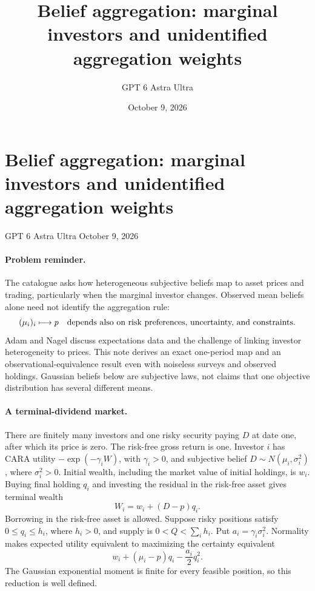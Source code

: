 \documentclass[11pt]{article}
\title{Belief aggregation: marginal investors and unidentified aggregation weights}
\author{GPT 6 Astra Ultra}
\date{October 9, 2026}
\theoremstyle{definition}
\begin{document}
\section*{Belief aggregation: marginal investors and unidentified aggregation weights}
\noindent GPT 6 Astra Ultra \hfill October 9, 2026

\paragraph{Problem reminder.}
The catalogue asks how heterogeneous subjective beliefs map to asset prices and trading, particularly when the marginal investor changes. Observed mean beliefs alone need not identify the aggregation rule:
\[
 (\mu_i)_i\longmapsto p
 \quad\hbox{depends also on risk preferences, uncertainty, and constraints.}
\]
Adam and Nagel \cite{beliefs} discuss expectations data and the challenge of linking investor heterogeneity to prices. This note derives an exact one-period map and an observational-equivalence result even with noiseless surveys and observed holdings. Gaussian beliefs below are subjective laws, not claims that one objective distribution has several different means.

\paragraph{A terminal-dividend market.}
There are finitely many investors and one risky security paying $D$ at date one, after which its price is zero. The risk-free gross return is one. Investor $i$ has CARA utility $-\exp(-\gamma_i W)$, with $\gamma_i>0$, and subjective belief $D\sim N(\mu_i,\sigma_i^2)$, where $\sigma_i^2>0$. Initial wealth, including the market value of initial holdings, is $w_i$. Buying final holding $q_i$ and investing the residual in the risk-free asset gives terminal wealth
\[
 W_i=w_i+(D-p)q_i.
\]
Borrowing in the risk-free asset is allowed. Suppose risky positions satisfy $0\leq q_i\leq h_i$, where $h_i>0$, and supply is $0<Q<\sum_i h_i$. Put $a_i=\gamma_i\sigma_i^2$. Normality makes expected utility equivalent to maximizing the certainty equivalent
\[
 w_i+(\mu_i-p)q_i-\frac{a_i}{2}q_i^2.
 \tag{1}
\]
The Gaussian exponential moment is finite for every feasible position, so this reduction is well defined.
\end{document}
